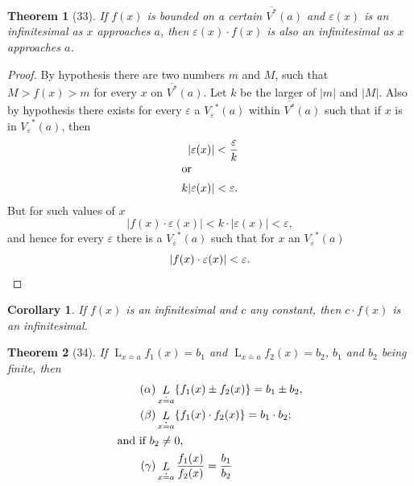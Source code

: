 \documentclass[a4paper,12pt]{book}[2004/02/16]
\providecommand{\hypertarget}[2]{#2}
\theoremstyle{ilemma}
\theoremstyle{itheorem}
\newtheorem{theorem}{Theorem}
\theoremstyle{iother}
\theoremstyle{icorollary}
\newtheorem{corollary}{Corollary}
\theoremstyle{numcorollary}
\theoremstyle{idefinition}
\begin{document}
\begin{theorem}[33]\hypertarget{thm33}{}
If $f(x)$ is bounded on a certain $\overline{V^*}(a)$ and
$\varepsilon(x)$ is an infinitesimal as $x$ approaches $a$, then
$\varepsilon(x)\cdot f(x)$ is also an infinitesimal as $x$ approaches
$a$.
\end{theorem}

\begin{proof}
By hypothesis there are two numbers $m$ and $M$, such that $M>f(x)>m$
for every $x$ on $\overline{V^*}(a)$. Let $k$ be the larger of $|m|$
and $|M|$. Also by hypothesis there exists for every $\varepsilon$ a
${V_\varepsilon}^*(a)$ within $\overline{V^*}(a)$ such that if $x$ is
in ${V_\varepsilon}^*(a)$, then
\begin{align*}
  |\varepsilon(x)|&< \frac{\varepsilon}{k} \\
\intertext{or}
   k|\varepsilon(x)|&< \varepsilon.
\end{align*}
But for such values of $x$
\[
  |f(x)\cdot\varepsilon(x)|
< k\cdot|\varepsilon(x)|< \varepsilon,
\]
and hence for every $\varepsilon$ there is a ${V_\varepsilon}^*(a)$
such that for $x$ an ${V_\varepsilon}^*(a)$
\[
  |f(x)\cdot\varepsilon(x)|< \varepsilon.\qedhere
\]
\end{proof}

\begin{corollary}
If $f(x)$ is an infinitesimal and $c$ any constant, then $c \cdot
f(x)$ is an infinitesimal.
\end{corollary}

\begin{theorem}[34]\hypertarget{thm34}{}
If $\displaystyle \mathop{L}_{x \doteq a} f_1(x)=b_1$ and
$\displaystyle \mathop{L}_{x \doteq a} f_2(x)=b_2$, $b_1$ and $b_2$
being finite, then
\begin{align*}
\tag{$\alpha$}
  &\mathop{L}_{x\doteq a} \{f_1(x) \pm f_2(x)\} = b_1 \pm b_2,
\\
\tag{$\beta$}
  &\mathop{L}_{x\doteq a} \{f_1(x) \cdot f_2(x)\} = b_1 \cdot b_2;
\\
\intertext{and if $b_2\neq 0$,}
\tag{$\gamma$}
    &\mathop{L}_{x\doteq a} \frac{f_1(x)}{f_2(x)} = \frac{b_1}{b_2}
\end{align*}
\end{theorem}
\end{document}
